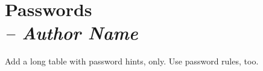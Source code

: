 \chapter{Passwords \\
\small{\textit{-- Author Name}}
\label{Chapter::Passwords}}

Add a long table with password hints, only.  Use password rules, too.